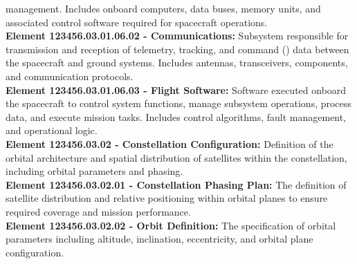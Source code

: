 management. Includes onboard computers, data buses, memory units, and
associated control software required for spacecraft operations.\\
\textbf{Element 123456.03.01.06.02 - Communications:} Subsystem responsible for
transmission and reception of telemetry, tracking, and command () data
between the spacecraft and ground systems. Includes antennas, transceivers, 
components, and communication protocols.\\
\textbf{Element 123456.03.01.06.03 - Flight Software:} Software executed onboard the
spacecraft to control system functions, manage subsystem operations, process data,
and execute mission tasks. Includes control algorithms, fault management, and
operational logic.\\
\textbf{Element 123456.03.02 - Constellation Configuration:} Definition of the orbital
architecture and spatial distribution of satellites within the constellation, including
orbital parameters and phasing.\\
\textbf{Element 123456.03.02.01 - Constellation Phasing Plan:} The definition of satellite
distribution and relative positioning within orbital planes to ensure required coverage
and mission performance.\\
\textbf{Element 123456.03.02.02 - Orbit Definition:} The specification of orbital parameters
including altitude, inclination, eccentricity, and orbital plane configuration.

